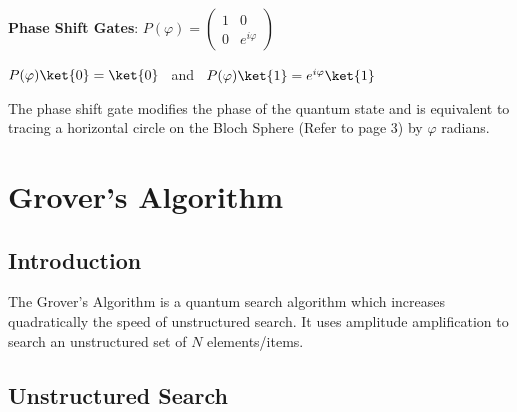 \documentclass{article}
\begin{document}
\textbf{Phase Shift Gates}: \qquad $ P(\varphi) = \begin{pmatrix} 1 & 0 \\ 0 & e^{i\varphi} \end{pmatrix}$ 
\vspace{5mm}

\qquad $P(\varphi)\ket{0} = \ket{0}$ \ and \ $P(\varphi)\ket{1} = e^{i\varphi}\ket{1}$
\vspace{5mm}

\noindent
The phase shift gate modifies the phase of the quantum state and is equivalent to tracing a horizontal circle  on the Bloch Sphere (Refer to page 3) by $\varphi$ radians\cite{noauthor_quantum_nodate}. 
\pagebreak






\section{Grover's Algorithm}
\subsection{Introduction}

The Grover's Algorithm is a quantum search algorithm which increases quadratically the speed of unstructured search\cite{noauthor_grovers_nodate}. It uses  amplitude amplification to search an unstructured set of $N$ elements/items. 

\subsection{Unstructured Search}
\vspace{10mm}
\end{document}
